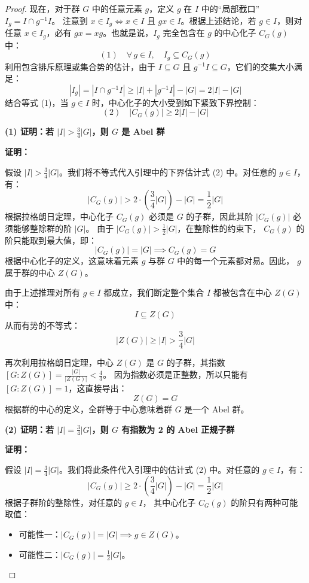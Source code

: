 \documentclass[]{article}
\begin{document}
\begin{proof}
现在，对于群 $G$ 中的任意元素 $g$，定义 $g$ 在 $I$ 中的“局部截口” $I_g = I \cap g^{-1}I$。
注意到 $x \in I_g \iff x \in I \text{ 且 } gx \in I$。根据上述结论，若 $g \in I$，则对任意 $x \in I_g$，必有 $gx = xg$。也就是说，$I_g$ 完全包含在 $g$ 的中心化子 $C_G(g)$ 中：
\[ (1) \quad \forall \, g \in I, \quad I_g \subseteq C_G(g) \]
利用包含排斥原理或集合势的估计，由于 $I \subseteq G$ 且 $g^{-1}I \subseteq G$，它们的交集大小满足：
\[ |I_g| = |I \cap g^{-1}I| \ge |I| + |g^{-1}I| - |G| = 2|I| - |G| \]
结合等式 (1)，当 $g \in I$ 时，中心化子的大小受到如下紧致下界控制：
\[ (2) \quad |C_G(g)| \ge 2|I| - |G| \]

\bigskip
\noindent \textbf{(1) 证明：若 $|I| > \frac{3}{4} |G|$，则 $G$ 是 Abel 群}

\medskip
\noindent \textbf{证明：}

假设 $|I| > \frac{3}{4} |G|$。我们将不等式代入引理中的下界估计式 (2) 中。对任意的 $g \in I$，有：
\[ |C_G(g)| > 2 \cdot \left(\frac{3}{4}|G|\right) - |G| = \frac{1}{2}|G| \]
根据拉格朗日定理，中心化子 $C_G(g)$ 必须是 $G$ 的子群，因此其阶 $|C_G(g)|$ 必须能够整除群的阶 $|G|$。
由于 $|C_G(g)| > \frac{1}{2}|G|$，在整除性的约束下， $C_G(g)$ 的阶只能取到最大值，即：
\[ |C_G(g)| = |G| \implies C_G(g) = G \]
根据中心化子的定义，这意味着元素 $g$ 与群 $G$ 中的每一个元素都对易。因此， $g$ 属于群的中心 $Z(G)$。

由于上述推理对所有 $g \in I$ 都成立，我们断定整个集合 $I$ 都被包含在中心 $Z(G)$ 中：
\[ I \subseteq Z(G) \]
从而有势的不等式：
\[ |Z(G)| \ge |I| > \frac{3}{4}|G| \]

再次利用拉格朗日定理，中心 $Z(G)$ 是 $G$ 的子群，其指数 $[G : Z(G)] = \frac{|G|}{|Z(G)|} < \frac{4}{3}$。
因为指数必须是正整数，所以只能有 $[G : Z(G)] = 1$，这直接导出：
\[ Z(G) = G \]
根据群的中心的定义，全群等于中心意味着群 $G$ 是一个 Abel 群。

\bigskip
\noindent \textbf{(2) 证明：若 $|I| = \frac{3}{4} |G|$，则 $G$ 有指数为 2 的 Abel 正规子群}

\medskip
\noindent \textbf{证明：}

假设 $|I| = \frac{3}{4} |G|$。我们将此条件代入引理中的估计式 (2) 中。对任意的 $g \in I$，有：
\[ |C_G(g)| \ge 2 \cdot \left(\frac{3}{4}|G|\right) - |G| = \frac{1}{2}|G| \]
根据子群阶的整除性，对任意的 $g \in I$， 其中心化子 $C_G(g)$ 的阶只有两种可能取值：
\begin{itemize}
	\item 可能性一：$|C_G(g)| = |G| \implies g \in Z(G)$。
	\item 可能性二：$|C_G(g)| = \frac{1}{2}|G|$。
\end{itemize}


\end{proof}
\end{document}
